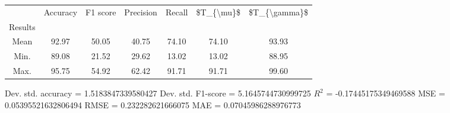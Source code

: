 \begin{tabular}{|c|c|c|c|c|c|c|}
\toprule
{} &  Accuracy &  F1 score &  Precision &  Recall &  \$T\_\{\textbackslash mu\}\$ &  \$T\_\{\textbackslash gamma\}\$ \\
Results &           &           &            &         &            &               \\
\hline
Mean    &     92.97 &     50.05 &      40.75 &   74.10 &      74.10 &         93.93 \\
Min.    &     89.08 &     21.52 &      29.62 &   13.02 &      13.02 &         88.95 \\
Max.    &     95.75 &     54.92 &      62.42 &   91.71 &      91.71 &         99.60 \\
\bottomrule
\end{tabular}

 Dev. std. accuracy = 1.5183847339580427
 Dev. std. F1-score = 5.1645744730999725
 $R^2$ = -0.17445175349469588
 MSE = 0.05395521632806494
 RMSE = 0.232282621666075
 MAE = 0.07045986288976773
